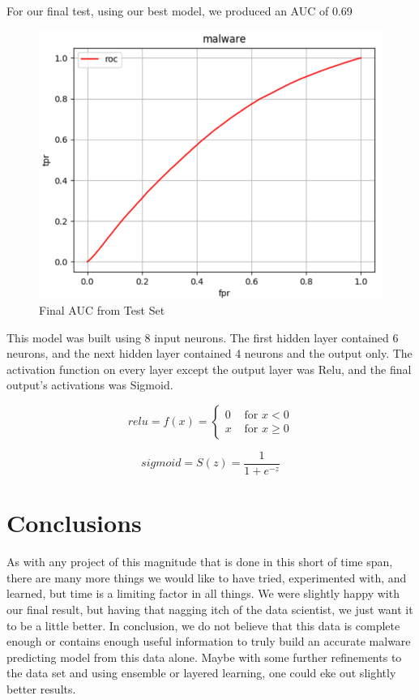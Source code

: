 \documentclass[sigconf]{acmart}
\begin{document}
For our final test, using our best model, we produced an AUC of 0.69

 \begin{figure}
  \includegraphics[width=\linewidth]{keras.PNG}
  \caption{Final AUC from Test Set}
  \label{fig:linear}
\end{figure}

This model was built using 8 input neurons. The first hidden layer contained 6 neurons, and the next hidden layer contained 4 neurons and the output only. The activation function on every layer except the output layer was Relu, and the final output’s activations was Sigmoid. 

\begin{equation}
relu = f(x)=\left\{\begin{array}{ll}{0} & {\text { for } x<0} \\ {x} & {\text { for } x \geq 0}\end{array}\right.
\end{equation}

\begin{equation}
sigmoid = S(z)=\frac{1}{1+e^{-z}}
\end{equation}


\section{Conclusions}
As with any project of this magnitude that is done in this short of time span, there are many more things we would like to have tried, experimented with, and learned, but time is a limiting factor in all things. We were slightly happy with our final result, but having that nagging itch of the data scientist, we just want it to be a little better. In conclusion, we do not believe that this data is complete enough or contains enough useful information to truly build an accurate malware predicting model from this data alone. Maybe with some further refinements to the data set and using ensemble or layered learning, one could eke out slightly better results.
\end{document}
